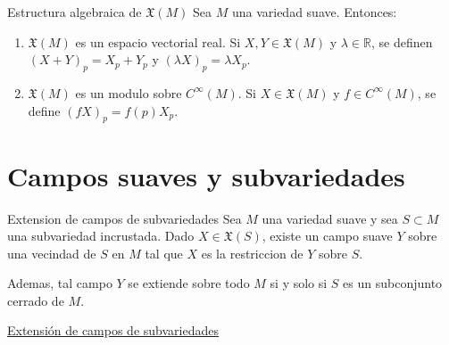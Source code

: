 \begin{bookproposition}{Estructura algebraica de $\mathfrak X(M)$}
Sea $M$ una variedad suave. Entonces:

\begin{enumerate}
\item $\mathfrak X(M)$ es un espacio vectorial real. Si $X,Y \in \mathfrak X(M)$ y $\lambda \in \mathbb R$, se definen $(X+Y)_p=X_p+Y_p$ y $(\lambda X)_p=\lambda X_p$.
\item $\mathfrak X(M)$ es un modulo sobre $C^\infty(M)$. Si $X \in \mathfrak X(M)$ y $f \in C^\infty(M)$, se define $(fX)_p=f(p)X_p$.
\end{enumerate}
\end{bookproposition}
\section{Campos suaves y subvariedades}
\begin{bookproposition}{Extension de campos de subvariedades}
Sea $M$ una variedad suave y sea $S \subset M$ una subvariedad incrustada. Dado $X \in \mathfrak X(S)$, existe un campo suave $Y$ sobre una vecindad de $S$ en $M$ tal que $X$ es la restriccion de $Y$ sobre $S$.

Ademas, tal campo $Y$ se extiende sobre todo $M$ si y solo si $S$ es un subconjunto cerrado de $M$.

\end{bookproposition}
\begin{bookproof}{}
\hyperref[blk:7d5d0b]{Extensión de campos de subvariedades}

\bookqed
\end{bookproof}
